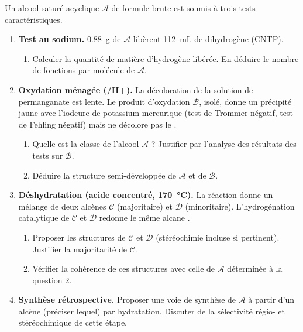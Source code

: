 \documentclass[11pt]{article}
\begin{document}
\begin{exercice}
Un alcool saturé acyclique $\mathcal{A}$ de formule brute  est soumis à trois tests caractéristiques.
\begin{enumerate}
    \item \textbf{Test au sodium.} \SI{0,88}{\gram} de $\mathcal{A}$ libèrent \SI{112}{\mL} de dihydrogène (CNTP).
    \begin{enumerate}
        \item Calculer la quantité de matière d'hydrogène libérée. En déduire le nombre de fonctions  par molécule de $\mathcal{A}$.
    \end{enumerate}
    \item \textbf{Oxydation ménagée (/H+).} La décoloration de la solution de permanganate est lente. Le produit d'oxydation $\mathcal{B}$, isolé, donne un précipité jaune avec l'iodeure de potassium mercurique (test de Trommer négatif, test de Fehling négatif) mais ne décolore pas le .
    \begin{enumerate}
        \item Quelle est la classe de l'alcool $\mathcal{A}$ ? Justifier par l'analyse des résultats des tests sur $\mathcal{B}$.
        \item Déduire la structure semi-développée de $\mathcal{A}$ et de $\mathcal{B}$.
    \end{enumerate}
    \item \textbf{Déshydratation (acide concentré, \SI{170}{\celsius}).} La réaction donne un mélange de deux alcènes $\mathcal{C}$ (majoritaire) et $\mathcal{D}$ (minoritaire). L'hydrogénation catalytique de $\mathcal{C}$ et $\mathcal{D}$ redonne le même alcane .
    \begin{enumerate}
        \item Proposer les structures de $\mathcal{C}$ et $\mathcal{D}$ (stéréochimie incluse si pertinent). Justifier la majoritarité de $\mathcal{C}$.
        \item Vérifier la cohérence de ces structures avec celle de $\mathcal{A}$ déterminée à la question 2.
    \end{enumerate}
    \item \textbf{Synthèse rétrospective.} Proposer une voie de synthèse de $\mathcal{A}$ à partir d'un alcène  (préciser lequel) par hydratation. Discuter de la sélectivité régio- et stéréochimique de cette étape.
\end{enumerate}
\end{exercice}
\end{document}

